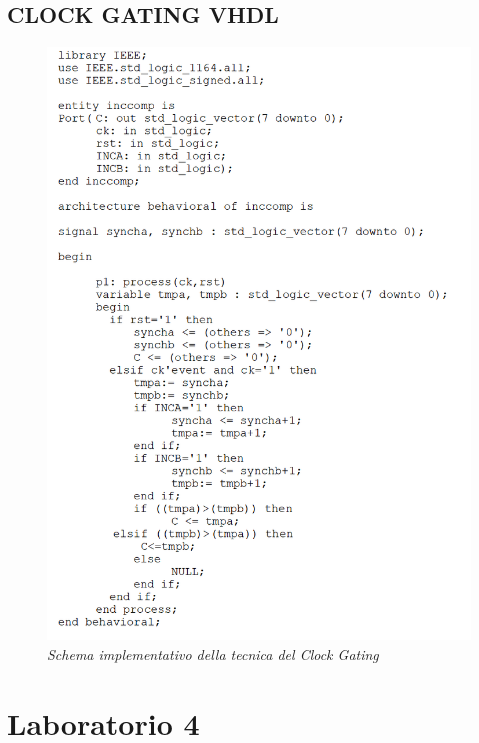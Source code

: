 \subsection{CLOCK GATING VHDL}
\nopagebreak
\begin{figure}[!htb]
	\centering
	\includegraphics[scale=1]{immagini/3_vhdl}
	\caption{\textit{Schema implementativo della tecnica del Clock Gating}}
	\label{3_vhdl}
\end{figure}
\newpage
\section{Laboratorio 4}
